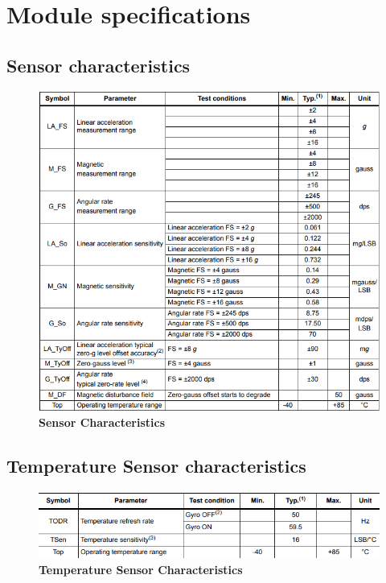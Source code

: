 %
%



\chapter{Module specifications}

\section{Sensor characteristics}
\begin{figure}[h!]
	\centering	\includegraphics[width=\linewidth]{Images/sensorchara}
	\caption{\textbf{Sensor Characteristics}} 
\end{figure}
\newpage

\section{Temperature Sensor characteristics}
\begin{figure}[h!]
	\centering	\includegraphics[width=\linewidth]{Images/tempchara}
	\caption{\textbf{Temperature Sensor Characteristics}} 
\end{figure}



